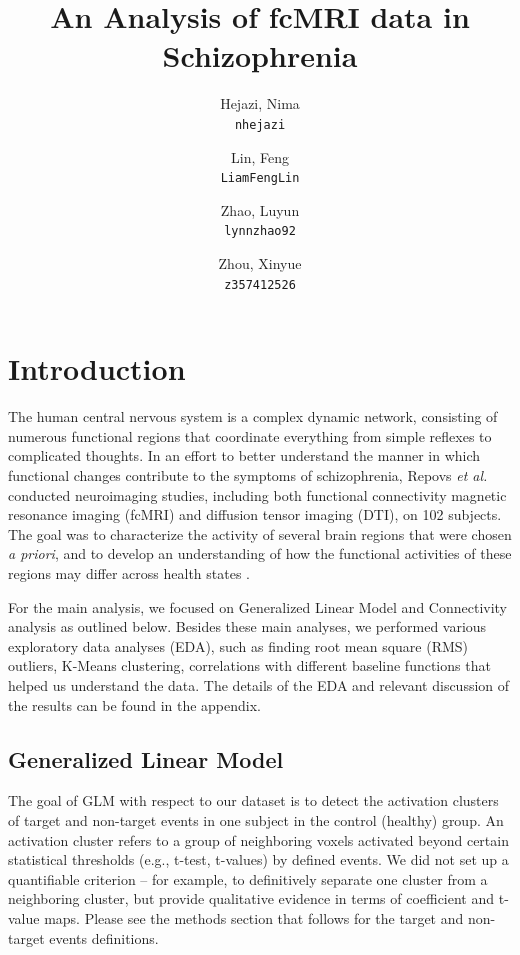 \documentclass[11pt]{article}
\title{An Analysis of fcMRI data in Schizophrenia}
\author{
  Hejazi, Nima\\
  \texttt{nhejazi}
  \and
  Lin, Feng\\
  \texttt{LiamFengLin}
  \and
  Zhao, Luyun\\
  \texttt{lynnzhao92}
  \and
  Zhou, Xinyue\\
  \texttt{z357412526}
}
\begin{document}
\maketitle


\section{Introduction}

The human central nervous system is a complex dynamic network, consisting of
numerous functional regions that coordinate everything from simple reflexes to
complicated thoughts. In an effort to better understand the manner in which
functional changes contribute to the symptoms of schizophrenia, Repovs \textit{et
al.} conducted neuroimaging studies, including both functional connectivity
magnetic resonance imaging (fcMRI) and diffusion tensor imaging (DTI), on 102
subjects. The goal was to characterize the activity of several brain
regions that were chosen \textit{a priori}, and to develop an understanding of how 
the functional activities of these regions may differ across health states \cite{repovs2011,repovs2012}.

For the main analysis, we focused on Generalized Linear Model and Connectivity analysis as outlined below. Besides these main analyses, we performed various exploratory data analyses (EDA), such as finding root mean square (RMS) outliers, K-Means clustering, correlations with different baseline functions that helped us understand the data. The details of the EDA and relevant discussion of the results can be found in the appendix. 

\subsection{Generalized Linear Model}

The goal of GLM with respect to our dataset is to detect the activation clusters of target and non-target events in one subject in the control (healthy) group. An activation cluster refers to a group of neighboring voxels activated beyond certain statistical thresholds (e.g., t-test, t-values) by defined events. We did not set up a quantifiable criterion -- for example, to definitively separate one cluster from a neighboring cluster, but provide qualitative evidence in terms of coefficient and t-value maps. Please see the methods section that follows for the target and non-target events definitions. 
\end{document}
